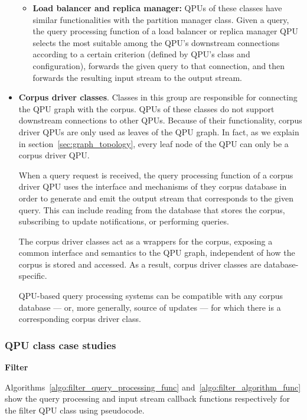 \begin{itemize}
\begin{itemize}
    \item \textbf{Load balancer and replica manager:}
    QPUs of these classes have similar functionalities with the partition manager class.
    Given a query, the query processing function of a load balancer or replica manager QPU selects the most suitable
    among the QPU's downstream connections according to a certain criterion (defined by QPU's class and configuration),
    forwards the given query to that connection, and then forwards the resulting input stream to the output stream.
    \end{itemize}

  \item \textbf{Corpus driver classes}.
  Classes in this group are responsible for connecting the QPU graph with the corpus.
  QPUs of these classes do not support downstream connections to other QPUs.
  Because of their functionality, corpus driver QPUs are only used as leaves of the QPU graph.
  In fact, as we explain in section~\ref{sec:graph_topology}, every leaf node of the QPU can only be a corpus driver QPU.

  When a query request is received, the query processing function of a corpus driver QPU uses the interface and mechanisms
  of they corpus database in order to generate and emit the output stream that corresponds to the given query.
  This can include reading from the database that stores the corpus, subscribing to update notifications,
  or performing queries.

  The corpus driver classes act as a wrappers for the corpus, exposing a common interface and semantics to the
  QPU graph, independent of how the corpus is stored and accessed.
  As a result, corpus driver classes are database-specific.

  QPU-based query processing systems can be compatible with any corpus database --- or, more generally, source of updates ---
  for which there is a corresponding corpus driver class.
\end{itemize}

\subsubsection{QPU class case studies}

\textbf{Filter}

Algorithms~\ref{algo:filter_query_processing_func} and~\ref{algo:filter_algorithm_func} show the query processing and
input stream callback functions respectively for the filter QPU class using pseudocode.


